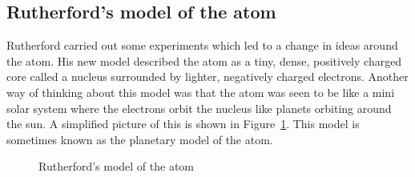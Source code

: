             \subsection*{Rutherford's model of the atom}
            \nopagebreak
\begin{minipage}{.5\textwidth}
            \label{m38756*id254751}Rutherford carried out some experiments which led to a change in ideas around the atom. His new model described the atom as a tiny, dense, positively charged core called a nucleus surrounded by lighter, negatively charged electrons. Another way of thinking about this model was that the atom was seen to be like a mini solar system where the electrons orbit the nucleus like planets orbiting around the sun. A simplified picture of this is shown in Figure~\ref{fig:atom:rutherfordmodel}. This model is sometimes known as the planetary model of the atom.\par 
\end{minipage}
\begin{minipage}{.5\textwidth}
    \setcounter{subfigure}{0}
	\begin{figure}[H] %
    \begin{center}
\caption{Rutherford's model of the atom}
\end{center}
\label{fig:atom:rutherfordmodel}
 \end{figure} 
\end{minipage}      
      \label{m38756*uid6}
